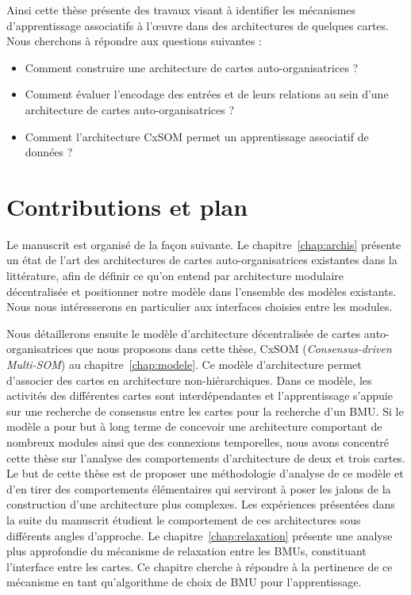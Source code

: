 Ainsi cette thèse présente des travaux visant à identifier les mécanismes d'apprentissage associatifs à l'\oe{}uvre dans des architectures de quelques cartes.
Nous cherchons à répondre aux questions suivantes :
\begin{itemize}
    \item Comment construire une architecture de cartes auto-organisatrices ?
    \item Comment évaluer l'encodage des entrées et de leurs relations au sein d'une architecture de cartes auto-organisatrices ?
    \item Comment l'architecture CxSOM permet un apprentissage associatif de données ?
\end{itemize}


\section*{Contributions et plan}

Le manuscrit est organisé de la façon suivante.
Le chapitre~\ref{chap:archis} présente un état de l'art des architectures de cartes auto-organisatrices existantes dans la littérature, afin de définir ce qu'on entend par architecture modulaire décentralisée et positionner notre modèle dans l'ensemble des modèles existants. Nous nous intéresserons en particulier aux interfaces choisies entre les modules.

Nous détaillerons ensuite le modèle d'architecture décentralisée de cartes auto-organisatrices que nous proposons dans cette thèse, CxSOM (\emph{Consensus-driven Multi-SOM}) au chapitre~\ref{chap:modele}.
Ce modèle d'architecture permet d'associer des cartes en architecture non-hiérarchiques. Dans ce modèle, les activités des différentes cartes sont interdépendantes et l'apprentissage s'appuie sur une recherche de consensus entre les cartes pour la recherche d'un BMU.
Si le modèle a pour but à long terme de concevoir une architecture comportant de nombreux modules ainsi que des connexions temporelles, nous avons concentré cette thèse sur l'analyse des comportements d'architecture de deux et trois cartes.
Le but de cette thèse est de proposer une méthodologie d'analyse de ce modèle et d'en tirer des comportements élémentaires qui serviront à poser les jalons de la construction d'une architecture plus complexes.
Les expériences présentées dans la suite du manuscrit étudient le comportement de ces architectures sous différents angles d'approche.
Le chapitre~\ref{chap:relaxation} présente une analyse plus approfondie du mécanisme de relaxation entre les BMUs, constituant l'interface entre les cartes. 
Ce chapitre cherche à répondre à la pertinence de ce mécanisme en tant qu'algorithme de choix de BMU pour l'apprentissage.

